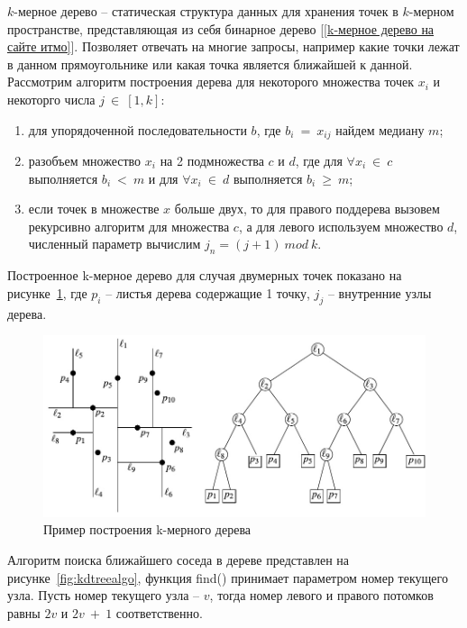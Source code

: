 \documentclass[14pt, a4paper]{extreport}
\begin{document}
	$k$-мерное дерево -- статическая структура данных для хранения точек в $k$-мерном пространстве, представляющая из себя бинарное дерево [\ref{k-мерное дерево на сайте итмо}]. Позволяет отвечать на многие запросы, например какие точки лежат в данном прямоугольнике или какая точка является ближайшей к данной. Рассмотрим алгоритм построения дерева для некоторого множества точек $x_i$ и некоторго числа $j~\in~[1, k]$:
	\begin{enumerate}[label={\arabic*)}]
		\item для упорядоченной последовательности $b$, где $b_i~=~x_{ij}$ найдем медиану $m$;
		\item разобъем множество $x_i$ на 2 подмножества $c$ и $d$, где для $\forall x_i~\in~c$ выполняется $b_i~<~m$ и для $\forall x_i~\in~d$ выполняется $b_i~\ge~m$;
		\item если точек в множестве $x$ больше двух, то для правого поддерева вызовем рекурсивно алгоритм для множества $c$, а для левого используем множество $d$, численный параметр вычислим $j_{n}=(j + 1)~mod~k$. 
	\end{enumerate}
	 Построенное k-мерное дерево для случая двумерных точек показано на рисунке~\ref{fig:kdtreeexample}, где $p_i$ -- листья дерева содержащие 1 точку, $j_j$ -- внутренние узлы дерева.
	
	\begin{figure}[h!]
		\centering
		\includegraphics[width = 13cm]{image/chapter_2/kdtreeexample}	
		\caption{Пример построения k-мерного дерева}
		\label{fig:kdtreeexample}
	\end{figure}
	
	Алгоритм поиска ближайшего соседа в дереве представлен на рисунке~\ref{fig:kdtreealgo}, функция find() принимает параметром номер текущего узла. Пусть номер текущего узла -- $v$, тогда номер левого и правого потомков равны $2v$ и $2v~+~1$ соответственно.
	
\end{document}
